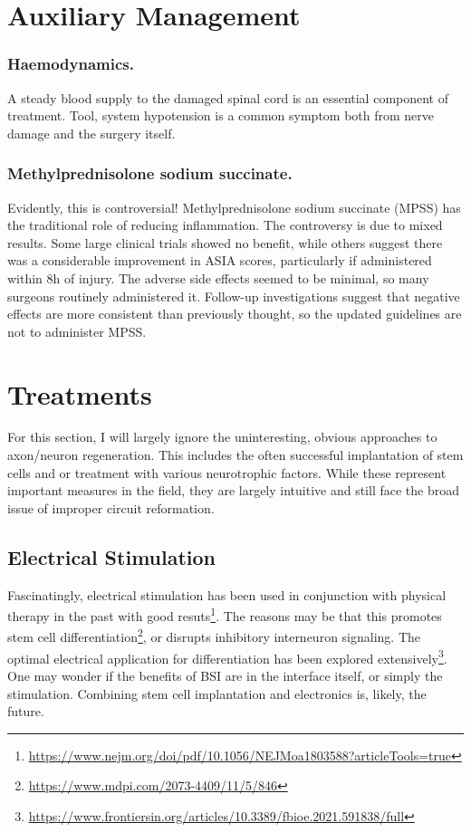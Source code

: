 \documentclass[12pt]{report}
\begin{document}
\section{Auxiliary Management}

\subsubsection{Haemodynamics.}
A steady blood supply to the damaged spinal cord is an essential component of treatment. Tool, system hypotension is a common symptom both from nerve damage and the surgery itself. 

\subsubsection{Methylprednisolone sodium succinate.}
Evidently, this is controversial! Methylprednisolone sodium succinate (MPSS) has the traditional role of reducing inflammation. The controversy is due to mixed results. Some large clinical trials showed no benefit, while others suggest there was a considerable improvement in ASIA scores, particularly if administered within 8h of injury. The adverse side effects seemed to be minimal, so many surgeons routinely administered it. Follow-up investigations suggest that negative effects are more consistent than previously thought, so the updated guidelines are not to administer MPSS. 

\section{Treatments}

For this section, I will largely ignore the uninteresting, obvious approaches to axon/neuron regeneration. This includes the often successful implantation of stem cells and or treatment with various neurotrophic factors. While these represent important measures in the field, they are largely intuitive and still face the broad issue of improper circuit reformation.\newline

\subsection{Electrical Stimulation}
Fascinatingly, electrical stimulation has been used in conjunction with physical therapy in the past with good resuts\footnote{\url{https://www.nejm.org/doi/pdf/10.1056/NEJMoa1803588?articleTools=true}}. The reasons may be that this promotes stem cell differentiation\footnote{\url{https://www.mdpi.com/2073-4409/11/5/846}}, or disrupts inhibitory interneuron signaling. The optimal electrical application for differentiation has been explored extensively\footnote{\url{https://www.frontiersin.org/articles/10.3389/fbioe.2021.591838/full}}. One may wonder if the benefits of BSI are in the interface itself, or simply the stimulation. Combining stem cell implantation and electronics is, likely, the future.\newline
\end{document}

